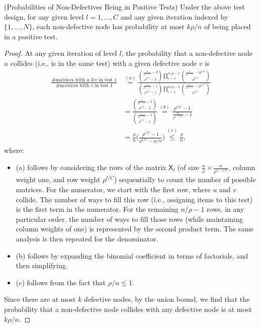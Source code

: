 \begin{lemma} \label{lem:rho_prob_of_nondef_node_being_in_pos_test} {\textup{(Probabilities of Non-Defectives Being in Positive Tests)}}
Under the above test design, for any given level $l=1,\dots,C$ and any given iteration indexed by $\{1,\dotsc,N\}$, each non-defective node has probability at most $k\rho/n$ of being placed in a positive test.
\end{lemma} 

\begin{proof}
At any given iteration of level $l$, the probability that a non-defective node $u$ collides (i.e., is in the same test) with a given defective node $v$ is
\begin{align}
    \frac{\text{\#matrices with $u$ \& $v$ in test $1$}}{\text{\#matrices with $v$ in test $1$}}
    &\stackrel{(a)}{=}\frac{{\frac{n}{\rho^{1-l/C}}-2\choose\rho^{l/C}-2}\prod_{i=1}^{n/\rho-1}{\frac{n}{\rho^{1-l/C}}-i\rho^{l/C}\choose\rho^{l/C}}}
    {{\frac{n}{\rho^{1-l/C}}-1\choose\rho^{l/C}-1}\prod_{i=1}^{n/\rho-1}{\frac{n}{\rho^{1-l/C}}-i\rho^{l/C}\choose\rho^{l/C}}} \\
    &=\frac{{\frac{n}{\rho^{1-l/C}}-2\choose\rho^{l/C}-2}}{{\frac{n}{\rho^{1-l/C}}-1\choose\rho^{l/C}-1}}
    \stackrel{(b)}{=}\frac{\rho^{l/C}-1}{\frac{n}{\rho^{1-l/C}}-1} \\
    &=\frac{\rho}{n}\bigg(\frac{\rho^{l/C}-1}{\rho^{l/C}-\rho/n}\bigg)
    \stackrel{(c)}{\leq}\frac{\rho}{n},
\end{align}
where:
\begin{itemize}
    \item (a) follows by considering the rows of the matrix $\mathsf{X}_l$ (of size $\frac{n}{\rho} \times \frac{n}{\rho^{1-l/C}}$, column weight one, and row weight $\rho^{l/C}$) sequentially to count the number of possible matrices. For the numerator, we start with the first row, where $u$ and $v$ collide.  The number of ways to fill this row (i.e., assigning items to this test) is the first term in the numerator. For the remaining $n/\rho-1$ rows, in any particular order, the number of ways to fill those rows (while maintaining column weights of one) is represented by the second product term. The same analysis is then repeated for the denominator.
    \item (b) follows by expanding the binomial coefficient in terms of factorials, and then simplifying.
    \item (c) follows from the fact that $\rho/n\leq1$.
\end{itemize}
Since there are at most $k$ defective nodes, by the union bound, we find that the probability that a non-defective node collides with any defective node is at most $k\rho/n$.
\end{proof}

